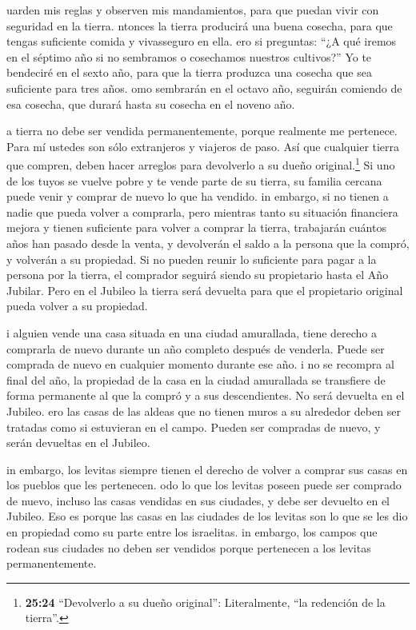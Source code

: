  uarden mis reglas y observen mis mandamientos, para que
puedan vivir con seguridad en la tierra.  ntonces la tierra
producirá una buena cosecha, para que tengas suficiente comida y
vivasseguro en ella.  ero si preguntas: ``¿A qué iremos en
el séptimo año si no sembramos o cosechamos nuestros cultivos?''
 Yo te bendeciré en el sexto año, para que la tierra
produzca una cosecha que sea suficiente para tres años. 
omo sembrarán en el octavo año, seguirán comiendo de esa cosecha, que
durará hasta su cosecha en el noveno año.

 a tierra no debe ser vendida permanentemente, porque
realmente me pertenece. Para mí ustedes son sólo extranjeros y viajeros
de paso.  Así que cualquier tierra que compren, deben hacer
arreglos para devolverlo a su dueño original.\footnote{\textbf{25:24}
  ``Devolverlo a su dueño original'': Literalmente, ``la redención de la
  tierra''.}  Si uno de los tuyos se vuelve pobre y te
vende parte de su tierra, su familia cercana puede venir y comprar de
nuevo lo que ha vendido.  in embargo, si no tienen a nadie
que pueda volver a comprarla, pero mientras tanto su situación
financiera mejora y tienen suficiente para volver a comprar la tierra,
 trabajarán cuántos años han pasado desde la venta, y
devolverán el saldo a la persona que la compró, y volverán a su
propiedad.  Si no pueden reunir lo suficiente para pagar a
la persona por la tierra, el comprador seguirá siendo su propietario
hasta el Año Jubilar. Pero en el Jubileo la tierra será devuelta para
que el propietario original pueda volver a su propiedad.

 i alguien vende una casa situada en una ciudad amurallada,
tiene derecho a comprarla de nuevo durante un año completo después de
venderla. Puede ser comprada de nuevo en cualquier momento durante ese
año.  i no se recompra al final del año, la propiedad de la
casa en la ciudad amurallada se transfiere de forma permanente al que la
compró y a sus descendientes. No será devuelta en el Jubileo.
 ero las casas de las aldeas que no tienen muros a su
alrededor deben ser tratadas como si estuvieran en el campo. Pueden ser
compradas de nuevo, y serán devueltas en el Jubileo.

 in embargo, los levitas siempre tienen el derecho de
volver a comprar sus casas en los pueblos que les pertenecen.
 odo lo que los levitas poseen puede ser comprado de nuevo,
incluso las casas vendidas en sus ciudades, y debe ser devuelto en el
Jubileo. Eso es porque las casas en las ciudades de los levitas son lo
que se les dio en propiedad como su parte entre los israelitas.
 in embargo, los campos que rodean sus ciudades no deben
ser vendidos porque pertenecen a los levitas permanentemente.


